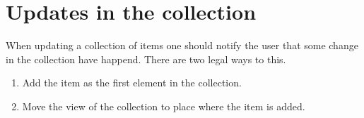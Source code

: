 \FloatBarrier

\section{Updates in the collection}
\label{sec:updates_in_the_collection}

When updating a collection of items one should notify the user that some change in the collection have happend. There are two legal ways to this. 
\begin{enumerate}
    \item Add the item as the first element in the collection.
    \item Move the view of the collection to place where the item is added.
\end{enumerate}



